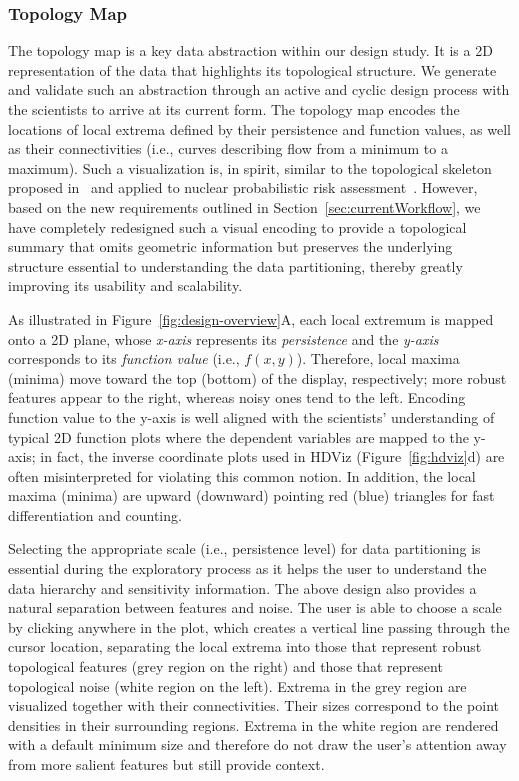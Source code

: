 \subsubsection{Topology Map}
\label{sec:topologyMap}
The topology map is a key data abstraction within our design study.
%
It is a 2D representation of the data that highlights its topological structure.
%
We generate and validate such an abstraction through an active and cyclic design process with the scientists to arrive at its current form.
%
The topology map encodes the locations of local extrema defined by their persistence and function values, as well as their connectivities (i.e., curves describing flow from a minimum to a maximum).
%
Such a visualization is, in spirit, similar to the topological skeleton proposed in~\cite{GerberBremerPascucci2010} and applied to nuclear probabilistic risk assessment~\cite{MaljovecWangMandelli2013a,MaljovecWangPascucci2013}.
%
However, based on the new requirements outlined in Section~\ref{sec:currentWorkflow}, we have completely redesigned such a visual encoding to provide a topological summary that omits geometric information but  preserves the underlying structure essential to understanding the data partitioning, thereby greatly improving its usability and scalability.

As illustrated in Figure~\ref{fig:design-overview}A, each local extremum is mapped onto a 2D plane, whose \emph{x-axis} represents its \emph{persistence} and the \emph{y-axis} corresponds to its \emph{function value} (i.e., $f(x,y)$).
%
Therefore, local maxima (minima) move toward the top (bottom) of the display, respectively; more robust features appear to the right, whereas noisy ones tend to the left.
%
Encoding function value to the y-axis is well aligned with the scientists' understanding of typical 2D function plots where the dependent variables are mapped to the y-axis; in fact, the inverse coordinate plots used in HDViz (Figure~\ref{fig:hdviz}d) are often misinterpreted for violating this common notion.
%
In addition, the local maxima (minima) are upward (downward) pointing red (blue)  triangles for fast differentiation and counting.

Selecting the appropriate scale (i.e., persistence level) for data partitioning is essential during the exploratory process as it helps the user to understand the data hierarchy and sensitivity information.
%
The above design also provides a natural separation between features and noise.
%
The user is able to choose a scale by clicking anywhere in the plot, which creates a vertical line passing through the cursor location, separating the local extrema into those that represent robust topological features (grey region on the right) and those that represent topological noise (white region on the left).
%
Extrema in the grey region are visualized together with their connectivities.
%
Their sizes correspond to the point densities in their surrounding regions.
%
Extrema in the white region are rendered with a default minimum size and therefore do not draw the user's attention away from more salient features but still provide context.

